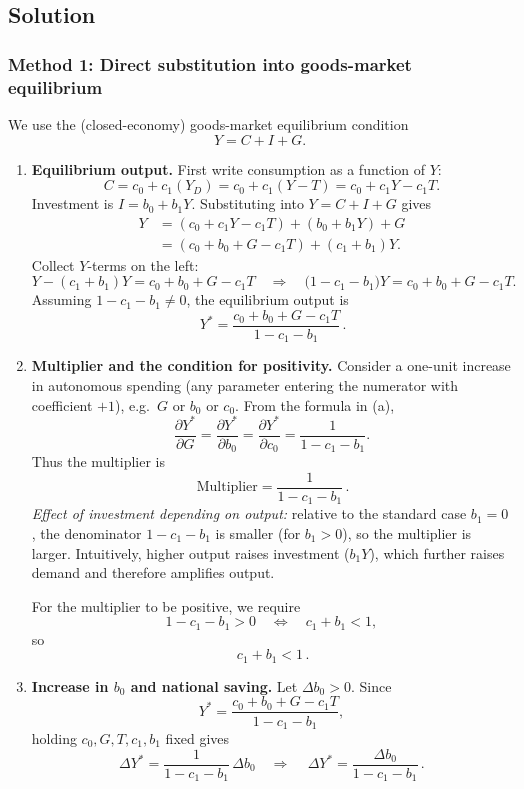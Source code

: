 \documentclass[12pt]{article}
\begin{document}
\subsection*{Solution}

\subsubsection*{Method 1: Direct substitution into goods-market equilibrium}
We use the (closed-economy) goods-market equilibrium condition
\[
Y = C + I + G.
\]

\begin{enumerate}[label=(\alph*)]
\item \textbf{Equilibrium output.}
First write consumption as a function of \(Y\):
\[
C = c_0 + c_1(Y_D)=c_0 + c_1(Y-T)=c_0 + c_1Y - c_1T.
\]
Investment is \(I=b_0+b_1Y\). Substituting into \(Y=C+I+G\) gives
\begin{align*}
Y &= (c_0 + c_1Y - c_1T) + (b_0 + b_1Y) + G \\
  &= (c_0 + b_0 + G - c_1T) + (c_1+b_1)Y.
\end{align*}
Collect \(Y\)-terms on the left:
\[
Y - (c_1+b_1)Y = c_0 + b_0 + G - c_1T
\quad\Longrightarrow\quad
\bigl(1-c_1-b_1\bigr)Y = c_0 + b_0 + G - c_1T.
\]
Assuming \(1-c_1-b_1\neq 0\), the equilibrium output is
\[
\boxed{\,
Y^*=\dfrac{c_0 + b_0 + G - c_1T}{1-c_1-b_1}
\, }.
\]

\item \textbf{Multiplier and the condition for positivity.}
Consider a one-unit increase in autonomous spending (any parameter entering the numerator with coefficient \(+1\)), e.g.\ \(G\) or \(b_0\) or \(c_0\).
From the formula in (a),
\[
\frac{\partial Y^*}{\partial G}
= \frac{\partial Y^*}{\partial b_0}
= \frac{\partial Y^*}{\partial c_0}
= \frac{1}{1-c_1-b_1}.
\]
Thus the multiplier is
\[
\boxed{\,\text{Multiplier}=\dfrac{1}{1-c_1-b_1}\, }.
\]
\emph{Effect of investment depending on output:} relative to the standard case \(b_1=0\), the denominator \(1-c_1-b_1\) is smaller (for \(b_1>0\)), so the multiplier is larger. Intuitively, higher output raises investment (\(b_1Y\)), which further raises demand and therefore amplifies output.

For the multiplier to be positive, we require
\[
1-c_1-b_1>0
\quad\Longleftrightarrow\quad
c_1+b_1<1,
\]
so
\[
\boxed{\,c_1+b_1<1\, }.
\]

\item \textbf{Increase in \(b_0\) and national saving.}
Let \(\Delta b_0>0\). Since
\[
Y^*=\frac{c_0+b_0+G-c_1T}{1-c_1-b_1},
\]
holding \(c_0,G,T,c_1,b_1\) fixed gives
\[
\Delta Y^*=\frac{1}{1-c_1-b_1}\,\Delta b_0
\quad\Rightarrow\quad
\boxed{\,\Delta Y^*=\dfrac{\Delta b_0}{1-c_1-b_1}\, }.
\]


\end{enumerate}
\end{document}
